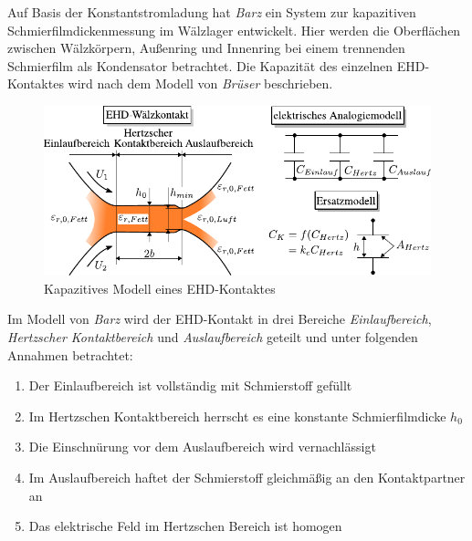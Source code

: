 Auf Basis der Konstantstromladung hat \textit{Barz} \cite{barz_1996} ein System zur kapazitiven Schmierfilmdickenmessung im Wälzlager entwickelt.
Hier werden die Oberflächen zwischen Wälzkörpern, Außenring und Innenring bei einem trennenden Schmierfilm als Kondensator betrachtet.
Die Kapazität des einzelnen EHD-Kontaktes wird nach dem Modell von \textit{Brüser} \cite{brueser_1972} beschrieben.
\begin{figure}[htb]
    \centering
    \includegraphics[]{./images/kapazitaet_schmierfilmdicke_modell.pdf}
    \caption{Kapazitives Modell eines EHD-Kontaktes \cite{barz_1996}}
    \label{fig:kapazitives_modell_eines_ehd_kontaktes}
\end{figure}
%

Im Modell von \textit{Barz} wird der EHD-Kontakt in drei Bereiche \textit{Einlaufbereich}, \textit{Hertzscher Kontaktbereich} und \textit{Auslaufbereich} geteilt und unter folgenden Annahmen betrachtet:
%
\begin{enumerate}
    \item Der Einlaufbereich ist vollständig mit Schmierstoff gefüllt
    \item Im Hertzschen Kontaktbereich herrscht es eine konstante Schmierfilmdicke $h_0$
    \item Die Einschnürung vor dem Auslaufbereich wird vernachlässigt
    \item Im Auslaufbereich haftet der Schmierstoff gleichmäßig an den Kontaktpartner an
    \item Das elektrische Feld im Hertzschen Bereich ist homogen
\end{enumerate}
%

